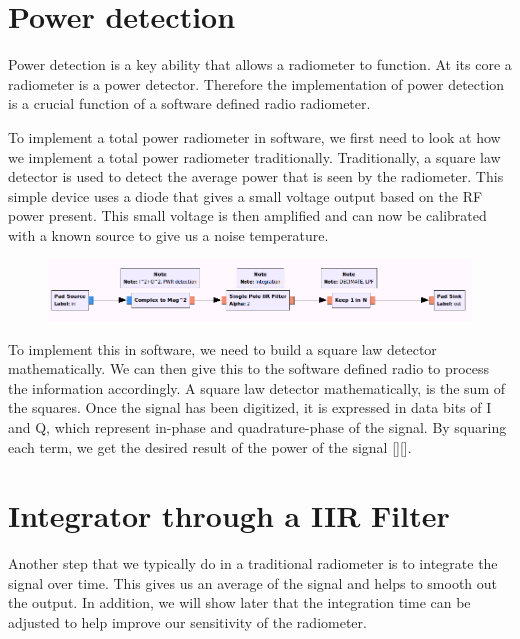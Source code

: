 \section{Power detection}
Power detection is a key ability that allows a radiometer to function.  At its core a radiometer is a power detector.  Therefore the implementation of power detection is a crucial function of a software defined radio radiometer.

To implement a total power radiometer in software, we first need to look at how we implement a total power radiometer traditionally.  Traditionally, a square law detector is used to detect the average power that is seen by the radiometer.  This simple device uses a diode that gives a small voltage output based on the RF power present.  This small voltage is then amplified and can now be calibrated with a known source to give us a noise temperature.  

{\begin{figure}[h!tb] 
\centering
\includegraphics[width=17cm]{Images/TPR_grc.png}
\label{square_block}
\end{figure}
}

To implement this in software, we need to build a square law detector mathematically.  We can then give this to the software defined radio to process the information accordingly.  A square law detector mathematically, is the sum of the squares.  Once the signal has been digitized, it is expressed in data bits of I and Q, which represent in-phase and quadrature-phase of the signal.  By squaring each term, we get the desired result of the power of the signal [\cite{Sarijari}][\cite{Rashid}].

\section{Integrator through a IIR Filter}

Another step that we typically do in a traditional radiometer is to integrate the signal over time.  This gives us an average of the signal and helps to smooth out the output.  In addition, we will show later that the integration time can be adjusted to help improve our sensitivity of the radiometer.

